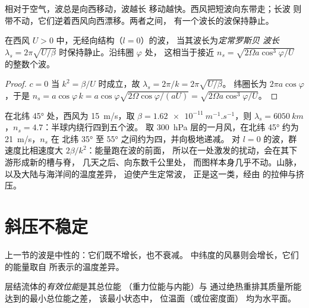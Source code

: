 相对于空气，波总是向西移动，波越长
移动越快。西风把短波向东带走；长波
则带不动，它们逆着西风向西漂移。两者之间，
有一个波长的波保持静止。

\begin{proposition}[定常罗斯贝波]\label{prop:b3:atmospheric-dynamics:stationary}
在西风 $U > 0$ 中，无经向结构（$l = 0$）的波，
当其波长为\emph{定常罗斯贝
波长} $\lambda_s =
2\pi\sqrt{U/\beta}$ 时保持静止。沿纬圈 $\varphi$ 处，
这相当于接近 $n_s = \sqrt{2\Omega a\cos^3\varphi/U}$ 的整数个波。
\end{proposition}

\begin{proof}
$c = 0$ 当 $k^2 = \beta/U$ 时成立，故 $\lambda_s = 2\pi/k = 2\pi\sqrt{U/\beta}$。
纬圈长为 $2\pi a\cos\varphi$，于是 $n_s = a\cos\varphi\,k =
a\cos\varphi\sqrt{2\Omega\cos\varphi/(aU)} = \sqrt{2\Omega a\cos^3\varphi/U}$。
\end{proof}

在北纬 \ang{45} 处，西风为 \qty{15}{m/s}，取 $\beta =
\qty{1.62e-11}{m^{-1}.s^{-1}}$，则 $\lambda_s = \qty{6050}{km}$，$n_s =
4.7$：半球内绕行四到五个波。
取 \qty{300}{hPa} 层的一月风，在北纬 \ang{45} 约为 \qty{21}{m/s}，$n_s$ 在
北纬 \ang{35} 至 \ang{55} 之间约为四，并向极地递减。
对 $l = 0$ 的波，群速度比相速度大 $2\beta/k^2$：能量跑在波的前面，
所以在一处激发的扰动，会在其下游形成新的槽与脊，
几天之后、向东数千公里处，
而图样本身几乎不动。山脉，以及大陆与海洋间的温度差异，
迫使产生定常波，
正是这一类，经由
的拉伸与挤压。


\section{斜压不稳定}\label{sec:b3:atmospheric-dynamics:baroclinic}

上一节的波是中性的：它们既不增长，也不衰减。
中纬度的风暴则会增长，它们的能量取自
所表示的温度差异。

\begin{definition}[有效位能]\label{def:b3:atmospheric-dynamics:ape}
层结流体的\emph{有效位能}是其总位能
（重力位能与内能）与
通过绝热重排其质量所能达到的最小总位能之差，
该最小状态中，
位温面（或位密度面）
均为水平面。
\end{definition}

